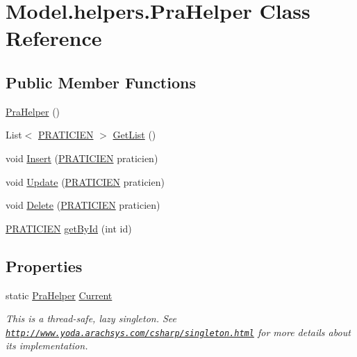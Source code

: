 \hypertarget{class_model_1_1helpers_1_1_pra_helper}{\section{Model.\-helpers.\-Pra\-Helper Class Reference}
\label{class_model_1_1helpers_1_1_pra_helper}
}
\subsection*{Public Member Functions}
\begin{DoxyCompactItemize}
\item 
\hyperlink{class_model_1_1helpers_1_1_pra_helper_a8c9cd7c816ccb26ad9c3c82d0843e99c}{Pra\-Helper} ()
\item 
List$<$ \hyperlink{class_model_1_1_p_r_a_t_i_c_i_e_n}{P\-R\-A\-T\-I\-C\-I\-E\-N} $>$ \hyperlink{class_model_1_1helpers_1_1_pra_helper_a57cc7cb47128c4170db9a942da04d84e}{Get\-List} ()
\item 
void \hyperlink{class_model_1_1helpers_1_1_pra_helper_abb536bc7ef8a3661ed9148f7e4bec3b9}{Insert} (\hyperlink{class_model_1_1_p_r_a_t_i_c_i_e_n}{P\-R\-A\-T\-I\-C\-I\-E\-N} praticien)
\item 
void \hyperlink{class_model_1_1helpers_1_1_pra_helper_a9c43e8aff193128dc80135fad232c8bd}{Update} (\hyperlink{class_model_1_1_p_r_a_t_i_c_i_e_n}{P\-R\-A\-T\-I\-C\-I\-E\-N} praticien)
\item 
void \hyperlink{class_model_1_1helpers_1_1_pra_helper_a12c4b5afc31f107e2c915fd503733106}{Delete} (\hyperlink{class_model_1_1_p_r_a_t_i_c_i_e_n}{P\-R\-A\-T\-I\-C\-I\-E\-N} praticien)
\item 
\hyperlink{class_model_1_1_p_r_a_t_i_c_i_e_n}{P\-R\-A\-T\-I\-C\-I\-E\-N} \hyperlink{class_model_1_1helpers_1_1_pra_helper_a8c3228c86ce8e9b1206dceb1323be34d}{get\-By\-Id} (int id)
\end{DoxyCompactItemize}
\subsection*{Properties}
\begin{DoxyCompactItemize}
\item 
static \hyperlink{class_model_1_1helpers_1_1_pra_helper}{Pra\-Helper} \hyperlink{class_model_1_1helpers_1_1_pra_helper_a9fa42a78879906ceb14876fff51c9124}{Current}
\begin{DoxyCompactList}\small\item\em This is a thread-\/safe, lazy singleton. See \href{http://www.yoda.arachsys.com/csharp/singleton.html}{\tt http\-://www.\-yoda.\-arachsys.\-com/csharp/singleton.\-html} for more details about its implementation. \end{DoxyCompactList}\end{DoxyCompactItemize}


